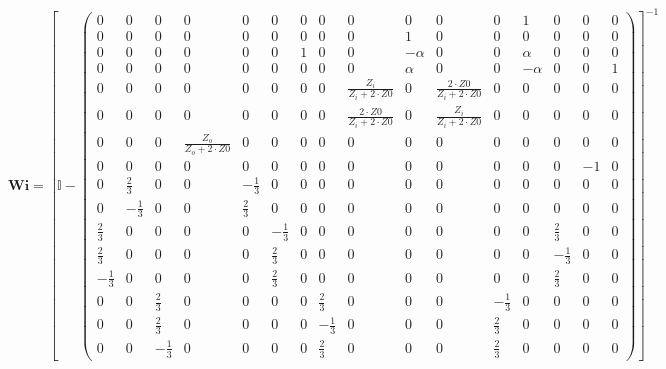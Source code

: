 \[ \mathbf{Wi} =  \left[ \mathbb{I}  - \left(\begin{smallmatrix} 0 & 0
& 0 & 0 & 0 & 0 & 0 & 0 & 0 & 0 & 0 & 0 & 1 & 0 & 0 & 0 \\ 0 & 0 & 0 &
0 & 0 & 0 & 0 & 0 & 0 & 1 & 0 & 0 & 0 & 0 & 0 & 0 \\ 0 & 0 & 0 & 0 & 0
& 0 & 1 & 0 & 0 & -\alpha & 0 & 0 & \alpha & 0 & 0 & 0 \\ 0 & 0 & 0 &
0 & 0 & 0 & 0 & 0 & 0 & \alpha & 0 & 0 & -\alpha & 0 & 0 & 1 \\ 0 & 0
& 0 & 0 & 0 & 0 & 0 & 0 & \frac{Z_i}{Z_i+2\cdot Z0} & 0 & \frac{2\cdot
Z0}{Z_i+2\cdot Z0} & 0 & 0 & 0 & 0 & 0 \\ 0 & 0 & 0 & 0 & 0 & 0 & 0 &
0 & \frac{2\cdot Z0}{Z_i+2\cdot Z0} & 0 & \frac{Z_i}{Z_i+2\cdot Z0} &
0 & 0 & 0 & 0 & 0 \\ 0 & 0 & 0 & \frac{Z_o}{Z_o+2\cdot Z0} & 0 & 0 & 0
& 0 & 0 & 0 & 0 & 0 & 0 & 0 & 0 & 0 \\ 0 & 0 & 0 & 0 & 0 & 0 & 0 & 0 &
0 & 0 & 0 & 0 & 0 & 0 & -1 & 0 \\ 0 & \frac{2}{3} & 0 & 0 &
-\frac{1}{3} & 0 & 0 & 0 & 0 & 0 & 0 & 0 & 0 & 0 & 0 & 0 \\ 0 &
-\frac{1}{3} & 0 & 0 & \frac{2}{3} & 0 & 0 & 0 & 0 & 0 & 0 & 0 & 0 & 0
& 0 & 0 \\ \frac{2}{3} & 0 & 0 & 0 & 0 & -\frac{1}{3} & 0 & 0 & 0 & 0
& 0 & 0 & 0 & \frac{2}{3} & 0 & 0 \\ \frac{2}{3} & 0 & 0 & 0 & 0 &
\frac{2}{3} & 0 & 0 & 0 & 0 & 0 & 0 & 0 & -\frac{1}{3} & 0 & 0 \\
-\frac{1}{3} & 0 & 0 & 0 & 0 & \frac{2}{3} & 0 & 0 & 0 & 0 & 0 & 0 & 0
& \frac{2}{3} & 0 & 0 \\ 0 & 0 & \frac{2}{3} & 0 & 0 & 0 & 0 &
\frac{2}{3} & 0 & 0 & 0 & -\frac{1}{3} & 0 & 0 & 0 & 0 \\ 0 & 0 &
\frac{2}{3} & 0 & 0 & 0 & 0 & -\frac{1}{3} & 0 & 0 & 0 & \frac{2}{3} &
0 & 0 & 0 & 0 \\ 0 & 0 & -\frac{1}{3} & 0 & 0 & 0 & 0 & \frac{2}{3} &
0 & 0 & 0 & \frac{2}{3} & 0 & 0 & 0 & 0 \end{smallmatrix}\right)
\right]^{-1}  \]
